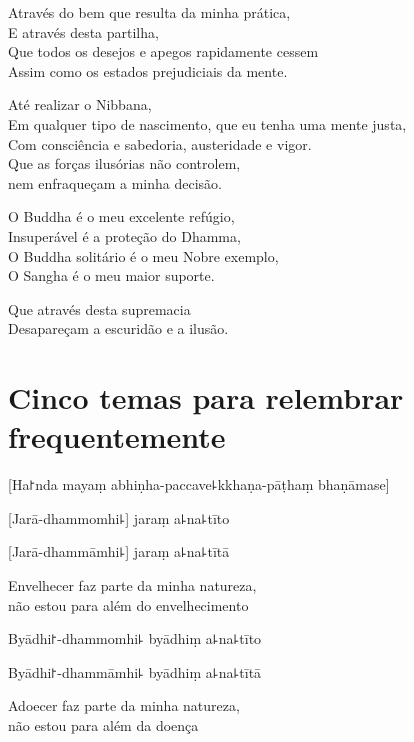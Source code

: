 \documentclass[
  babelLanguage=portuguese,
  final,
]{chantingbook}
\begin{document}
Através do bem que resulta da minha prática,\\
E através desta partilha,\\
Que todos os desejos e apegos rapidamente cessem\\
Assim como os estados prejudiciais da mente.

Até realizar o Nibbana,\\
Em qualquer tipo de nascimento, que eu tenha uma mente justa,\\
Com consciência e sabedoria, austeridade e vigor.\\
Que as forças ilusórias não controlem,\\
nem enfraqueçam a minha decisão.

O Buddha é o meu excelente refúgio,\\
Insuperável é a proteção do Dhamma,\\
O Buddha solitário é o meu Nobre exemplo,\\
O Sangha é o meu maior suporte.

Que através desta supremacia\\
Desapareçam a escuridão e a ilusão.

\chapter[Cinco Temas]{Cinco temas para relembrar frequentemente}

\begin{leader}
  [Ha꜓nda mayaṃ abhiṇha-paccave꜕kkhaṇa-pāṭhaṃ bhaṇāmase]
\end{leader}

%
[Jarā-dhammomhi꜕] jaraṃ a꜕na꜕tīto

%
[Jarā-dhammāmhi꜕] jaraṃ a꜕na꜕tītā

\begin{english}
  Envelhecer faz parte da minha natureza,\\
  não estou para além do envelhecimento
\end{english}

%
Byādhi꜓-dhammomhi꜕ byādhiṃ a꜕na꜕tīto

%
Byādhi꜓-dhammāmhi꜕ byādhiṃ a꜕na꜕tītā

\begin{english}
  Adoecer faz parte da minha natureza,\\
  não estou para além da doença
\end{english}
\end{document}
